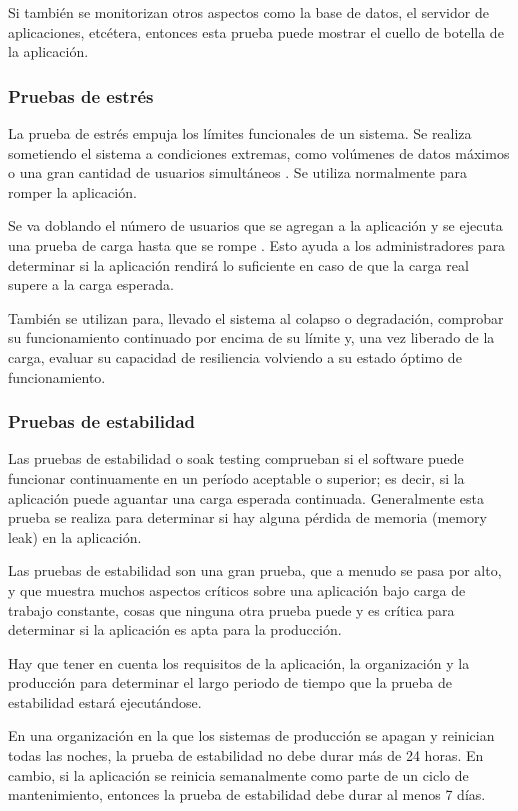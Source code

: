 Si también se monitorizan otros aspectos como la base de datos, el servidor de aplicaciones, etcétera, entonces esta prueba puede mostrar el cuello de botella de la aplicación.

\subsubsection{Pruebas de estrés}

La prueba de estrés empuja los límites funcionales de un sistema. Se realiza sometiendo el sistema a condiciones extremas, como volúmenes de datos máximos o una gran cantidad de usuarios simultáneos \cite{test5}. Se utiliza normalmente para romper la aplicación.

Se va doblando el número de usuarios que se agregan a la aplicación y se ejecuta una prueba de carga hasta que se rompe \cite{jmeter6}. Esto ayuda a los administradores para determinar si la aplicación rendirá lo suficiente en caso de que la carga real supere a la carga esperada.

También se utilizan para, llevado el sistema al colapso o degradación, comprobar su funcionamiento continuado por encima de su límite y, una vez liberado de la carga, evaluar su capacidad de resiliencia volviendo a su estado óptimo de funcionamiento.

\subsubsection{Pruebas de estabilidad}

Las pruebas de estabilidad o soak testing comprueban si el software puede funcionar continuamente en un período aceptable o superior; es decir, si la aplicación puede aguantar una carga esperada continuada. Generalmente esta prueba se realiza para determinar si hay alguna pérdida de memoria (memory leak) en la aplicación.

Las pruebas de estabilidad son una gran prueba, que a menudo se pasa por alto, y que muestra muchos aspectos críticos sobre una aplicación bajo carga de trabajo constante, cosas que ninguna otra prueba puede y es crítica para determinar si la aplicación es apta para la producción.

Hay que tener en cuenta los requisitos de la aplicación, la organización y la producción para determinar el largo periodo de tiempo que la prueba de estabilidad estará ejecutándose.

En una organización en la que los sistemas de producción se apagan y reinician todas las noches, la prueba de estabilidad no debe durar más de 24 horas. En cambio, si la aplicación se reinicia semanalmente como parte de un ciclo de mantenimiento, entonces la prueba de estabilidad debe durar al menos 7 días.

